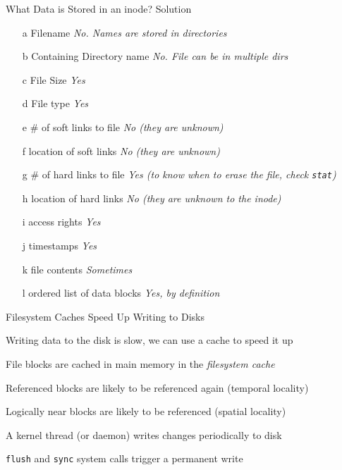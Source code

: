   \begin{frame}{What Data is Stored in an inode? Solution}
     \small
      \begin{itemize}
        \item[a] Filename \textit{No. Names are stored in directories}
        \item[b] Containing Directory name \textit{No. File can be in multiple dirs}
        \item[c] File Size \textit{Yes}
        \item[d] File type \textit{Yes}
        \item[e] \# of soft links to file \textit{No (they are unknown)}
        \item[f] location of soft links \textit{No (they are unknown)}
        \item[g] \# of hard links to file \textit{Yes (to know when to erase the file, check \texttt{stat})}
        \item[h] location of hard links \textit{No (they are unknown to the inode)}
        \item[i] access rights \textit{Yes}
        \item[j] timestamps \textit{Yes}
        \item[k] file contents \textit{Sometimes}
        \item[l] ordered list of data blocks \textit{Yes, by definition} 
      \end{itemize}
  \end{frame}

  \begin{frame}{Filesystem Caches Speed Up Writing to Disks}

    Writing data to the disk is slow, we can use a cache to speed it up

    \vspace{2em}

    File blocks are cached in main memory in the \textit{filesystem cache}
    
    \hspace{2em} Referenced blocks are likely to be referenced again (temporal locality)

    \hspace{2em}Logically near blocks are likely to be referenced (spatial locality)

    \vspace{2em}

    A kernel thread (or daemon) writes changes periodically to disk

    \vspace{2em}
    
    \texttt{flush} and \texttt{sync} system calls trigger a permanent write
  \end{frame}


